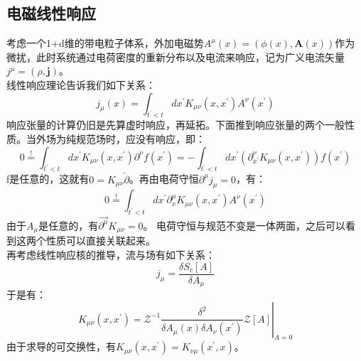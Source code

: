 \documentclass[10pt,openany]{book}
\theoremstyle{thmstyle} %
\theoremstyle{defstyle} %
\theoremstyle{prostyle} %
\begin{document}
\subsection{电磁线性响应}
考虑一个1+d维的带电粒子体系，外加电磁势$ A^\mu(x)=(\phi(x), \mathbf{A}(x)) $作为微扰，此时系统通过电荷密度的重新分布以及电流来响应，记为广义电流矢量$ j^\mu=(\rho, \mathbf{j}) $。\\
线性响应理论告诉我们如下关系：
\begin{equation}
  j_\mu(x)=\int_{t^{\prime}<t} d x^{\prime} K_{\mu \nu}\left(x, x^{\prime}\right) A^\nu\left(x^{\prime}\right)
\end{equation}
响应张量的计算仍旧是先算虚时响应，再延拓。下面推到响应张量的两个一般性质。当外场为纯规范场时，应没有响应，即：
\begin{equation}
  0 \stackrel{!}{=} \int_{t^{\prime}<t} d x^{\prime} K_{\mu \nu}\left(x, x^{\prime}\right) \partial^\nu f\left(x^{\prime}\right)=-\int_{t^{\prime}<t} d x^{\prime}\left(\partial_{x^{\prime}}^\nu K_{\mu \nu}\left(x, x^{\prime}\right)\right) f\left(x^{\prime}\right)
\end{equation}
f是任意的，这就有$ 0=K_{\mu \nu} \overleftarrow{\partial} $。再由电荷守恒$ \partial^\mu j_\mu=0 $，有：
 \begin{equation}
  0 \stackrel{!}{=} \int_{t^{\prime}<t} d x^{\prime} \partial_x^\mu K_{\mu \nu}\left(x, x^{\prime}\right) A^\nu\left(x^{\prime}\right)
 \end{equation}
 由于$ A_\mu $是任意的，有$ \overrightarrow{\partial^\mu} K_{\mu \nu}=0 $。
电荷守恒与规范不变是一体两面，之后可以看到这两个性质可以直接关联起来。\\

再考虑线性响应核的推导，流与场有如下关系：
\begin{equation}
  j_\mu=\frac{\delta S_c[A]}{\delta A_\mu}
\end{equation}
于是有：
\begin{equation}
  K_{\mu \nu}\left(x, x^{\prime}\right)=\left.\mathcal{Z}^{-1} \frac{\delta^2}{\delta A_\mu(x) \delta A_\nu\left(x^{\prime}\right)} \mathcal{Z}[A]\right|_{A=0}
\end{equation}
由于求导的可交换性，有$ K_{\mu \nu}\left(x, x^{\prime}\right)=K_{\nu \mu}\left(x^{\prime}, x\right) $。
\end{document}
